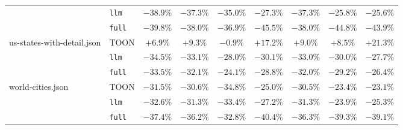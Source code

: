 \begin{table}[t]
\begin{tabular}{@{}llccccccc@{}}
     & \texttt{llm} & $-38.9\%$ & $-37.3\%$ & $-35.0\%$ & $-27.3\%$ & $-37.3\%$ & $-25.8\%$ & $-25.6\%$ \\
     & \texttt{full} & $-39.8\%$ & $-38.0\%$ & $-36.9\%$ & $-45.5\%$ & $-38.0\%$ & $-44.8\%$ & $-43.9\%$ \\
    \cline{2-9}
    \multirow{3}{*}{us-states-with-detail.json} & TOON & $+6.9\%$ & $+9.3\%$ & $-0.9\%$ & $+17.2\%$ & $+9.0\%$ & $+8.5\%$ & $+21.3\%$ \\
     & \texttt{llm} & $-34.5\%$ & $-33.1\%$ & $-28.0\%$ & $-30.1\%$ & $-33.0\%$ & $-30.0\%$ & $-27.7\%$ \\
     & \texttt{full} & $-33.5\%$ & $-32.1\%$ & $-24.1\%$ & $-28.8\%$ & $-32.0\%$ & $-29.2\%$ & $-26.4\%$ \\
    \cline{2-9}
    \multirow{3}{*}{world-cities.json} & TOON & $-31.5\%$ & $-30.6\%$ & $-34.8\%$ & $-25.0\%$ & $-30.5\%$ & $-23.4\%$ & $-23.1\%$ \\
     & \texttt{llm} & $-32.6\%$ & $-31.3\%$ & $-33.4\%$ & $-27.2\%$ & $-31.3\%$ & $-23.9\%$ & $-25.3\%$ \\
     & \texttt{full} & $-37.4\%$ & $-36.2\%$ & $-32.8\%$ & $-40.4\%$ & $-36.3\%$ & $-39.3\%$ & $-39.1\%$ \\
    \bottomrule
  \end{tabular}
\end{table}
